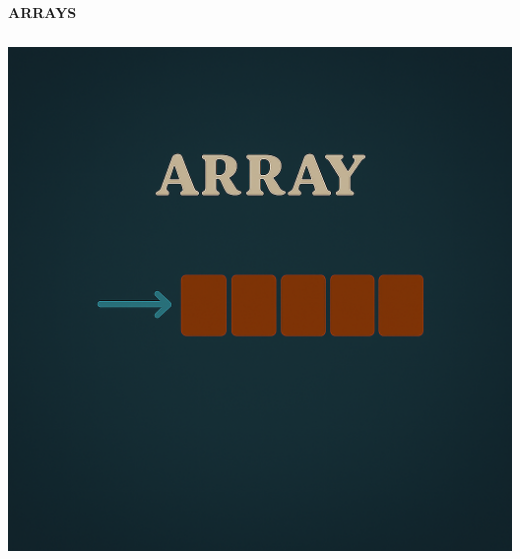 \documentclass[a4paper,10pt]{book}
\begin{document}
\begin{center}

{\fontsize{55}{20}\selectfont \textcolor{headingcolor}{\bfseries ARRAYS}}
\end{center}

\vspace{50mm}

\begin{center}
\includegraphics[height=13.88cm, width=17cm, keepaspectratio]{Pics/array.png}
\end{center}
\end{document}
